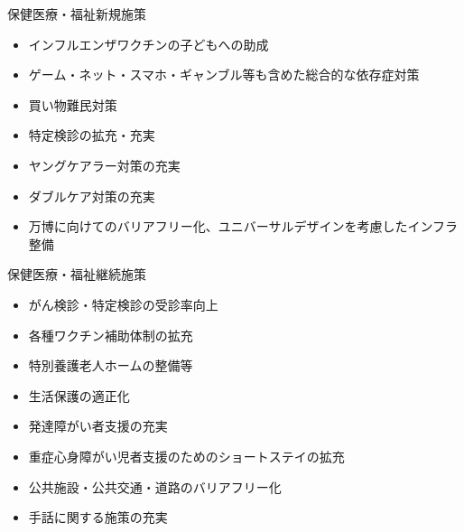 \documentclass[dvipdfmx]{beamer}
\begin{document}
    \begin{frame}{保健医療・福祉}{新規施策}
        \begin{small}
            \begin{itemize}
                \setlength{\itemsep}{2mm}
                \item インフルエンザワクチンの子どもへの助成
                \hspace{.2mm}
                \item \alert{ゲーム・ネット・スマホ・ギャンブル等も含めた総合的な依存症対策}
                \item 買い物難民対策
                \item 特定検診の拡充・充実
                \item ヤングケアラー対策の充実
                \item ダブルケア対策の充実
                \item 万博に向けてのバリアフリー化、ユニバーサルデザインを考慮したインフラ整備
            \end{itemize}
        \end{small}
    \end{frame}

    \begin{frame}{保健医療・福祉}{継続施策}
        \begin{small}
            \begin{itemize}
                \setlength{\itemsep}{2mm}
                \item がん検診・特定検診の受診率向上
                \item 各種ワクチン補助体制の拡充
                \item 特別養護老人ホームの整備等
                \item 生活保護の適正化
                \item 発達障がい者支援の充実
                \item 重症心身障がい児者支援のためのショートステイの拡充
                \item 公共施設・公共交通・道路のバリアフリー化
                \item 手話に関する施策の充実
            \end{itemize}
        \end{small}
    \end{frame}
\end{document}
